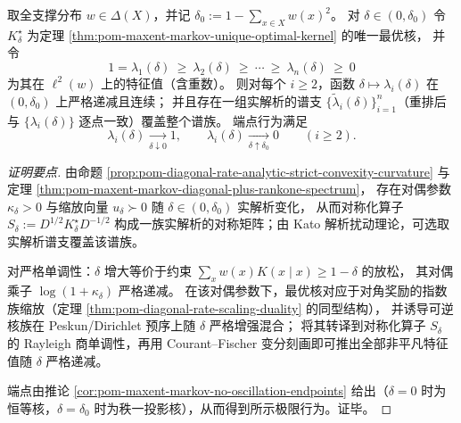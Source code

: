 \begin{theorem}\label{thm:pom-maxent-markov-spectrum-monotone-in-delta}
取全支撑分布 \(w\in\Delta(X)\)，并记 \(\delta_0:=1-\sum_{x\in X}w(x)^2\)。
对 \(\delta\in(0,\delta_0)\) 令 \(K^\star_\delta\) 为定理 \ref{thm:pom-maxent-markov-unique-optimal-kernel} 的唯一最优核，
并令
\[
1=\lambda_1(\delta)\ \ge\ \lambda_2(\delta)\ \ge\ \cdots\ \ge\ \lambda_n(\delta)\ \ge\ 0
\]
为其在 \(\ell^2(w)\) 上的特征值（含重数）。
则对每个 \(i\ge 2\)，函数 \(\delta\mapsto \lambda_i(\delta)\) 在 \((0,\delta_0)\) 上严格递减且连续；
并且存在一组实解析的谱支 \(\{\widetilde\lambda_i(\delta)\}_{i=1}^n\)（重排后与 \(\{\lambda_i(\delta)\}\) 逐点一致）覆盖整个谱族。
端点行为满足
\[
\lambda_i(\delta)\xrightarrow[\delta\downarrow 0]{}1,
\qquad
\lambda_i(\delta)\xrightarrow[\delta\uparrow \delta_0]{}0
\qquad(i\ge 2).
\]
\end{theorem}
\begin{proof}[证明要点]
由命题 \ref{prop:pom-diagonal-rate-analytic-strict-convexity-curvature} 与定理 \ref{thm:pom-maxent-markov-diagonal-plus-rankone-spectrum}，
存在对偶参数 \(\kappa_\delta>0\) 与缩放向量 \(u_\delta\succ0\) 随 \(\delta\in(0,\delta_0)\) 实解析变化，
从而对称化算子
\(
S_\delta:=D^{1/2}K^\star_\delta D^{-1/2}
\)
构成一族实解析的对称矩阵；由 Kato 解析扰动理论，可选取实解析谱支覆盖该谱族。
\par
对严格单调性：\(\delta\) 增大等价于约束 \(\sum_x w(x)K(x\mid x)\ge 1-\delta\) 的放松，
其对偶乘子 \(\log(1+\kappa_\delta)\) 严格递减。
在该对偶参数下，最优核对应于对角奖励的指数族缩放（定理 \ref{thm:pom-diagonal-rate-scaling-duality} 的同型结构），
并诱导可逆核族在 Peskun/Dirichlet 预序上随 \(\delta\) 严格增强混合；
将其转译到对称化算子 \(S_\delta\) 的 Rayleigh 商单调性，再用 Courant--Fischer 变分刻画即可推出全部非平凡特征值随 \(\delta\) 严格递减。
\par
端点由推论 \ref{cor:pom-maxent-markov-no-oscillation-endpoints} 给出（\(\delta=0\) 时为恒等核，\(\delta=\delta_0\) 时为秩一投影核），从而得到所示极限行为。证毕。
\end{proof}

